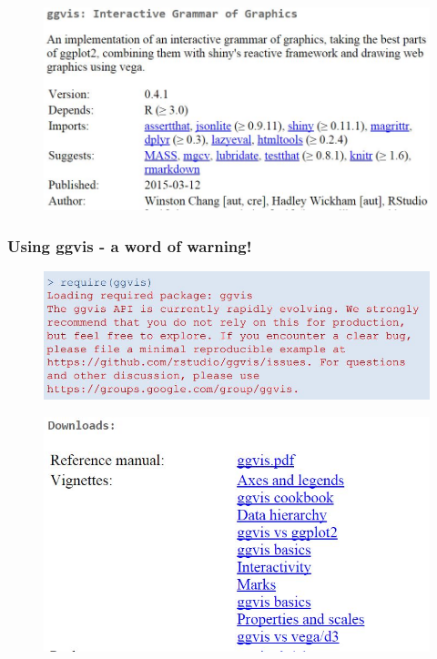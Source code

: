 \documentclass{beamer}
\begin{document}
\begin{frame}
	\begin{figure}
\centering
\includegraphics[width=1.05\linewidth]{images/CRAN-ggvis}

\end{figure}

\end{frame}
\begin{frame}
	\frametitle{Using ggvis - a word of warning!}
	\begin{figure}
		\centering
		\includegraphics[width=1.05\linewidth]{ggviswarning}
		\caption{}
		\label{fig:ggviswarning}
	\end{figure}
	
\end{frame}
\begin{frame}
	\begin{figure}
\centering
\includegraphics[width=1.05\linewidth]{images/CRAN-ggvis-vignettes}

\end{figure}

\end{frame}
\end{document}
